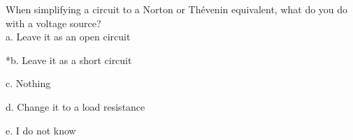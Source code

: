 
When simplifying a circuit to a Norton or Thévenin equivalent, what do you do with a voltage source? \\

a. Leave it as an open circuit

*b. Leave it as a short circuit

c. Nothing

d. Change it to a load resistance

e. I do not know \\
